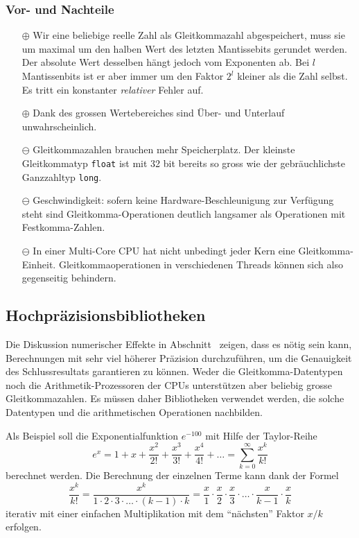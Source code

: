 \subsubsection{Vor- und Nachteile}
\begin{itemize}
\item[$\oplus$]
Wir eine beliebige reelle Zahl als Gleitkommazahl abgespeichert, muss
sie um maximal um den halben Wert des letzten Mantissebits gerundet werden.
Der absolute Wert desselben hängt jedoch vom Exponenten ab.
Bei $l$ Mantissenbits ist er aber immer um den Faktor $2^l$ kleiner
als die Zahl selbst.
Es tritt ein konstanter {\em relativer} Fehler auf.
\item[$\oplus$] Dank des grossen Wertebereiches sind Über- und Unterlauf
unwahrscheinlich.
\item[$\ominus$]
Gleitkommazahlen brauchen mehr Speicherplatz.
Der kleinste Gleitkommatyp \texttt{float} ist mit 32 bit bereits so gross wie
der gebräuchlichste Ganzzahltyp \texttt{long}.
\item[$\ominus$] Geschwindigkeit: sofern keine Hardware-Beschleunigung
zur Verfügung steht sind Gleitkomma-Operationen deutlich langsamer
als Operationen mit Festkomma-Zahlen.
\item[$\ominus$]
In einer Multi-Core CPU hat nicht unbedingt jeder Kern eine Gleitkomma-Einheit.
Gleitkommaoperationen in verschiedenen Threads können sich also gegenseitig
behindern.
\end{itemize}

%
%
\subsection{Hochpräzisionsbibliotheken
\label{buch:subsection:mp}}
Die Diskussion numerischer Effekte in
Abschnitt~\label{buch:section:numerische-effekte} zeigen, dass es nötig sein
kann, Berechnungen mit sehr viel höherer Präzision durchzuführen, um die
Genauigkeit des Schlussresultats garantieren zu können.
Weder die Gleitkomma-Datentypen noch die Arithmetik-Prozessoren der
CPUs unterstützen aber beliebig grosse Gleitkommazahlen.
Es müssen daher Bibliotheken verwendet werden, die solche Datentypen
und die arithmetischen Operationen nachbilden.

Als Beispiel soll die Exponentialfunktion $e^{-100}$ mit
Hilfe der Taylor-Reihe
\[
e^x
=
1 + x + \frac{x^2}{2!} + \frac{x^3}{3!} + \frac{x^4}{4!} + \dots
=
\sum_{k=0}^\infty \frac{x^k}{k!}
\]
berechnet werden.
Die Berechnung der einzelnen Terme kann dank der Formel
\begin{equation}
\frac{x^k}{k!}
=
\frac{x^k}{1\cdot 2\cdot 3 \cdot \ldots \cdot (k-1)\cdot k}
=
\frac{x}{1}
\cdot
\frac{x}{2}
\cdot
\frac{x}{3}
\cdot\dots\cdot
\frac{x}{k-1}
\cdot
\frac{x}{k}
\label{buch:eulerreihe:faktor}
\end{equation}
iterativ mit einer einfachen Multiplikation mit dem ``nächsten'' 
Faktor $x/k$ erfolgen.

